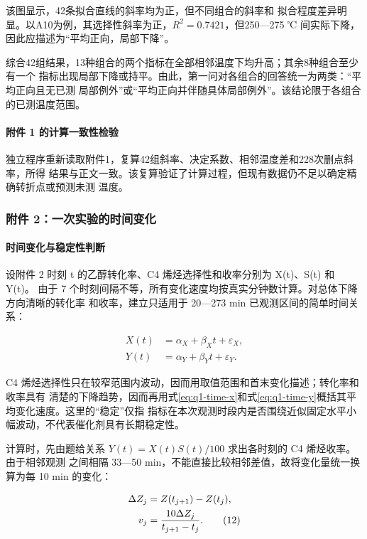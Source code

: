 该图显示，42条拟合直线的斜率均为正，但不同组合的斜率和
拟合程度差异明显。以A10为例，其选择性斜率为正，\(R^2=0.7421\)，但250---275 ℃
间实际下降，因此应描述为“平均正向，局部下降”。

综合42组结果，13种组合的两个指标在全部相邻温度下均升高；其余8种组合至少有一个
指标出现局部下降或持平。由此，第一问对各组合的回答统一为两类：“平均正向且无已测
局部例外”或“平均正向并伴随具体局部例外”。该结论限于各组合的已测温度范围。

\paragraph{附件 1 的计算一致性检验}

独立程序重新读取附件1，复算42组斜率、决定系数、相邻温度差和228次删点斜率，所得
结果与正文一致。该复算验证了计算过程，但现有数据仍不足以确定精确转折点或预测未测
温度。

\subsubsection{附件 2：一次实验的时间变化}

\paragraph{时间变化与稳定性判断}

设附件 2 时刻 t 的乙醇转化率、C4 烯烃选择性和收率分别为 X(t)、S(t) 和 Y(t)。
由于 7 个时刻间隔不等，所有变化速度均按真实分钟数计算。对总体下降方向清晰的转化率
和收率，建立只适用于 20---273 min 已观测区间的简单时间关系：

\begin{align}
X(t)&=\alpha_X+\beta_Xt+\varepsilon_X, \tag{10}\label{eq:q1-time-x}\\
Y(t)&=\alpha_Y+\beta_Yt+\varepsilon_Y. \tag{11}\label{eq:q1-time-y}
\end{align}

C4 烯烃选择性只在较窄范围内波动，因而用取值范围和首末变化描述；转化率和收率具有
清楚的下降趋势，因而再用式\eqref{eq:q1-time-x}和式\eqref{eq:q1-time-y}概括其平均变化速度。这里的``稳定''仅指
指标在本次观测时段内是否围绕近似固定水平小幅波动，不代表催化剂具有长期稳定性。

计算时，先由题给关系 \(Y(t)=X(t)S(t)/100\) 求出各时刻的 C4 烯烃收率。由于相邻观测
之间相隔 33---50 min，不能直接比较相邻差值，故将变化量统一换算为每 10 min 的变化：

\begin{align}
\Delta Z_j&=Z(t_{j+1})-Z(t_j),\notag\\
v_j&=\frac{10\Delta Z_j}{t_{j+1}-t_j}.
\tag{12}\label{eq:q1-time-change}
\end{align}

